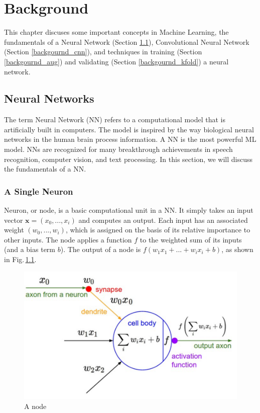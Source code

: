 \chapter{Background} 
\label{background} 
This chapter discuses some important concepts in Machine Learning, the fundamentals of a Neural Network (Section \ref{backgournd_nn}), Convolutional Neural Network (Section \ref{backgournd_cnn}), and techniques in training (Section \ref{backgournd_aug}) and validating (Section \ref{backgournd_kfold}) a neural network.


\section{Neural Networks}
\label{backgournd_nn}

The term Neural Network (NN) refers to a computational model that is artificially built in computers. The model is inspired by the way biological neural networks in the human brain process information. A NN is the most powerful ML model. NNs are recognized for many breakthrough achievements in speech recognition, computer vision, and text processing. In this section, we will discuss the fundamentals of a NN.

\subsection{A Single Neuron}
Neuron, or node, is a basic computational unit in a NN. It simply takes an input vector $\mathbf{x} = (x_0,...,x_i)$ and computes an output. Each input has an associated weight $(w_0,...,w_i)$, which is assigned on the basis of its relative importance to other inputs. The node applies a function $f$ to the weighted sum of its inputs (and a bias term $b$). The output of a node is $f(w_1x_1 +...+ w_ix_i + b)$, as shown in Fig.\,\ref{node}.
\begin{figure}
	\centering
	\includegraphics[scale=0.5]{Figs/node.png}
    \caption{A node \citep{cs231n}}
    \label{node}
\end{figure}

